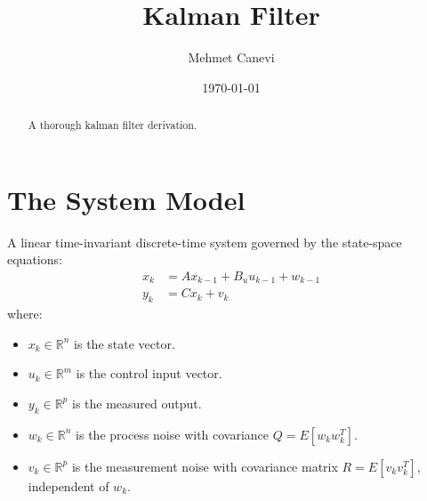 \documentclass{article}
\title{\textbf{Kalman Filter}}
\author{Mehmet Canevi}
\date{\today}
\begin{document}
\maketitle

\begin{abstract}
A thorough kalman filter derivation.
\end{abstract}

\section{The System Model}
A linear time-invariant discrete-time system governed by the state-space equations:
\begin{align}
    x_{k} &= A x_{k-1} + B_u u_{k-1} + w_{k-1} \\
    y_k &= C x_k + v_k
\end{align}
where:
\begin{itemize}
    \item $x_k \in \mathbb{R}^n$ is the state vector.
    \item $u_k \in \mathbb{R}^m$ is the control input vector.
    \item $y_k \in \mathbb{R}^p$ is the measured output.
    \item $w_k \in \mathbb{R}^n$ is the process noise with covariance $Q = E[w_k w_k^T]$.
    \item $v_k \in \mathbb{R}^p$ is the measurement noise with covariance matrix $R = E[v_k v_k^T]$, independent of $w_k$.
\end{itemize}
\end{document}
